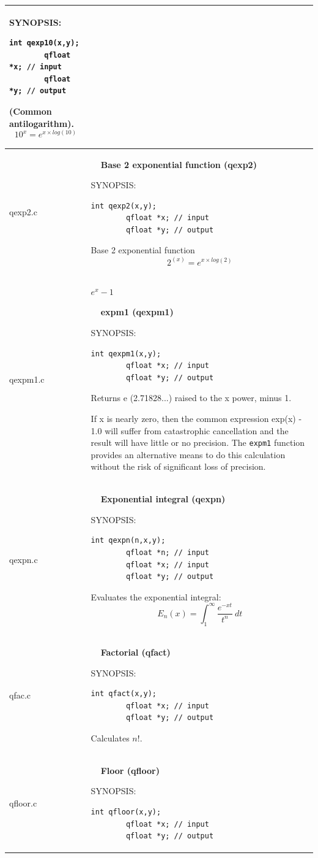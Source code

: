 \documentclass[10pt,a4paper,x11names]{memoir} %
\newcounter{entry}
\newcommand{\TOC}[1] {\addcontentsline{toc}{section}{\theentry\ \  #1} \textbf{\theentry\ \  #1} \par\stepcounter{entry}}
\begin{document}
\begin{longtable}{|p{1.5cm}|p{11.5cm}|}
	{\footnotesize SYNOPSIS:}\vspace{-0.2cm}\index{qexp10}
	\begin{lstlisting}[numbers=none]
		int qexp10(x,y);
		qfloat *x; // input
		qfloat *y; // output
	\end{lstlisting}\vspace{-0.2cm}
	(Common antilogarithm).
	$$10^x=e^{x \times log(10)}$$
	\\\hline
	qexp2.c& \TOC{Base 2 exponential function (qexp2)}
	
	{\footnotesize SYNOPSIS:}\vspace{-0.2cm}\index{qexp2}
	\begin{lstlisting}[numbers=none]
		int qexp2(x,y);
		qfloat *x; // input
		qfloat *y; // output
	\end{lstlisting}\vspace{-0.2cm}
	Base 2 exponential function
	$$2^(x)=e^{x\times log(2)}$$
	\\\hline
	qexpm1.c& $e^x - 1$ \TOC{expm1 (qexpm1)}\index{qexpm1}
	{\footnotesize SYNOPSIS:}\vspace{-0.2cm}
	\begin{lstlisting}[numbers=none]
		int qexpm1(x,y);
		qfloat *x; // input
		qfloat *y; // output
	\end{lstlisting}\vspace{-0.2cm}
	Returns e (2.71828...) raised to the x power, minus 1.
	
	 If x is nearly zero, then the common expression exp(x) - 1.0 will suffer from catastrophic
	cancellation and the result will have little or no precision.  The \verb,expm1, function provides
	an alternative means to do this calculation without the risk of significant loss of precision.
	\\\hline
	qexpn.c& \TOC{Exponential integral (qexpn)}
	
	{\footnotesize SYNOPSIS:}\vspace{-0.2cm}
	\begin{lstlisting}[numbers=none]
		int qexpn(n,x,y);
		qfloat *n; // input
		qfloat *x; // input
		qfloat *y; // output
	\end{lstlisting}\vspace{-0.2cm}\index{qexpn}
	Evaluates the exponential integral:
	$$E_n(x)=\int_{1}^{\infty}\frac{e^{-xt}}{t^n}\ dt$$
	\\\hline
	qfac.c& \TOC{Factorial (qfact)}
	
	{\footnotesize SYNOPSIS:}\vspace{-0.2cm}
	\begin{lstlisting}[numbers=none]
		int qfact(x,y);
		qfloat *x; // input
		qfloat *y; // output
	\end{lstlisting}\vspace{-0.2cm}
	Calculates $n!$.
	\\\hline
	qfloor.c&\TOC{Floor (qfloor)}
	{\footnotesize SYNOPSIS:}\vspace{-0.2cm}
	\begin{lstlisting}[numbers=none]
		int qfloor(x,y);
		qfloat *x; // input
		qfloat *y; // output
	\end{lstlisting}\vspace{-0.2cm}
	

\end{longtable}
\end{document}
